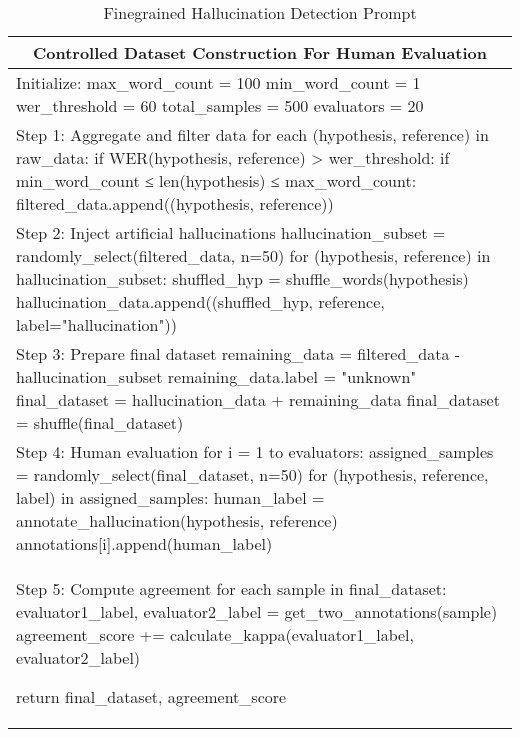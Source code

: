 
\begin{table*}[h]
    \centering
    \renewcommand{\arraystretch}{1.5}
    \begin{tabular}{|p{16cm}|}
        \hline
        \multicolumn{1}{|c|}{\textbf{Controlled Dataset Construction For Human Evaluation}} \\
        \hline

Initialize:  
  max_word_count = 100  
  min_word_count = 1  
  wer_threshold = 60  
  total_samples = 500  
  evaluators = 20  

\\ Step 1: Aggregate and filter data  
for each (hypothesis, reference) in raw_data:  
  if WER(hypothesis, reference) > wer_threshold:  
    if min_word_count ≤ len(hypothesis) ≤ max_word_count:  
      filtered_data.append((hypothesis, reference))  

\\ Step 2: Inject artificial hallucinations  
hallucination_subset = randomly_select(filtered_data, n=50)  
for (hypothesis, reference) in hallucination_subset:  
  shuffled_hyp = shuffle_words(hypothesis)  
  hallucination_data.append((shuffled_hyp, reference, label="hallucination"))  

\\ Step 3: Prepare final dataset  
remaining_data = filtered_data - hallucination_subset  
remaining_data.label = "unknown"  
final_dataset = hallucination_data + remaining_data  
final_dataset = shuffle(final_dataset)  

\\ Step 4: Human evaluation  
for i = 1 to evaluators:  
  assigned_samples = randomly_select(final_dataset, n=50)  
  for (hypothesis, reference, label) in assigned_samples:  
    human_label = annotate_hallucination(hypothesis, reference)  
    annotations[i].append(human_label)  

\\ Step 5: Compute agreement  
for each sample in final_dataset:  
  evaluator1_label, evaluator2_label = get_two_annotations(sample)  
  agreement_score += calculate_kappa(evaluator1_label, evaluator2_label)  

return final_dataset, agreement_score 
        \hline
    \end{tabular}
    \caption{Finegrained Hallucination Detection Prompt}
    \label{tab:HE_code}
\end{table*}
